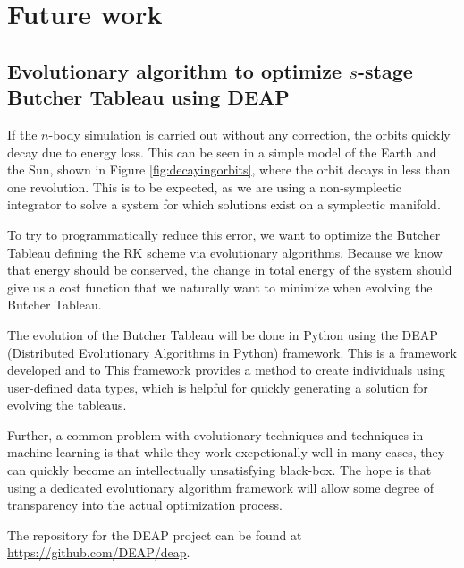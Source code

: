 \documentclass[onecolumn,titlepage,letterpaper,10pt]{article}
\begin{document}
\section{Future work}\label{sec:future}
\subsection{Evolutionary algorithm to optimize $s$-stage Butcher Tableau using
    DEAP\cite{DEAP}}

If the $n$-body simulation is carried out without any correction, the orbits
quickly decay due to energy loss. This can be seen in a simple model of the
Earth and the Sun, shown in Figure \ref{fig:decayingorbits},
where the orbit decays in less than one revolution. This is to be expected, as
we are using a non-symplectic integrator to solve a system for which solutions
exist on a symplectic manifold.

To try to programmatically reduce this error, we want to optimize the
Butcher Tableau defining the RK scheme via evolutionary algorithms.
Because we know that energy should
be conserved, the change in total energy of the system should give us a cost
function that we naturally want to minimize when evolving the Butcher Tableau.

The evolution of the Butcher Tableau will be done in Python using the DEAP
(Distributed Evolutionary Algorithms in Python) framework. This is a framework
developed  and to
\cite{DEAP} This framework
provides a method to create
individuals using user-defined data types, which is helpful for quickly
generating a solution for evolving the tableaus.

Further, a common problem with evolutionary techniques and techniques in machine
learning is that while they work excpetionally well in many cases, they can
quickly become an intellectually unsatisfying black-box. The hope is that using
a dedicated evolutionary algorithm framework will allow some degree of
transparency into the actual optimization process.

The repository for the DEAP project can be found at
\url{https://github.com/DEAP/deap}.

\end{document}

